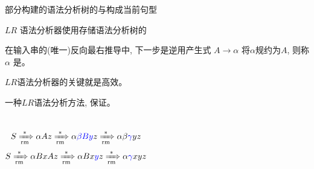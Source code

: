 
\begin{frame}{}
  \begin{center}
    部分构建的语法分析树的与构成当前句型

    \vspace{0.60cm}

    \vspace{0.60cm}
    $LR$ 语法分析器使用存储语法分析树的
  \end{center}
\end{frame}

\begin{frame}{}
  \begin{center}
    \begin{definition}[句柄 (Handle)]
      在输入串的(唯一)反向最右推导中, 下一步是逆用产生式 $A \to \alpha$
      将$\alpha$规约为$A$, 则称 $\alpha$ 是。
    \end{definition}

    \vspace{0.30cm}

    \vspace{0.30cm}
    $LR$语法分析器的关键就是高效。
  \end{center}
\end{frame}

\begin{frame}{}
  \begin{center}

    \begin{theorem}
      一种$LR$语法分析方法, 保证。
    \end{theorem}

    \pause

    \vspace{-0.30cm}
    \begin{columns}
        \[
          S \xRightarrow[\text{rm}]{\ast} \alpha Az \xRightarrow[\text{rm}]{\ast} \alpha\textcolor{blue}{\beta By}z
            \xRightarrow[\text{rm}]{\ast} \alpha\beta\textcolor{blue}{\gamma} yz
        \]
        \[
          S \xRightarrow[\text{rm}]{\ast} \alpha BxAz \xRightarrow[\text{rm}]{\ast} \alpha Bx\textcolor{blue}{y}z \xRightarrow[\text{rm}]{\ast} \alpha\textcolor{blue}{\gamma} xyz
        \]
    \end{columns}
  \end{center}
\end{frame}

